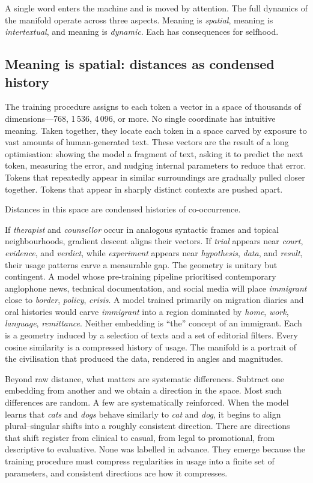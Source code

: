 A single word enters the machine and is moved by attention. The full dynamics of the manifold operate across three aspects. Meaning is \emph{spatial}, meaning is \emph{intertextual}, and meaning is \emph{dynamic}. Each has consequences for selfhood.

\subsection{Meaning is spatial: distances as condensed history}

The training procedure assigns to each token a vector in a space of thousands of dimensions---768, 1\,536, 4\,096, or more. No single coordinate has intuitive meaning. Taken together, they locate each token in a space carved by exposure to vast amounts of human-generated text. These vectors are the result of a long optimisation: showing the model a fragment of text, asking it to predict the next token, measuring the error, and nudging internal parameters to reduce that error. Tokens that repeatedly appear in similar surroundings are gradually pulled closer together. Tokens that appear in sharply distinct contexts are pushed apart.

Distances in this space are condensed histories of co-occurrence.

If \emph{therapist} and \emph{counsellor} occur in analogous syntactic frames and topical neighbourhoods, gradient descent aligns their vectors. If \emph{trial} appears near \emph{court}, \emph{evidence}, and \emph{verdict}, while \emph{experiment} appears near \emph{hypothesis}, \emph{data}, and \emph{result}, their usage patterns carve a measurable gap. The geometry is unitary but contingent. A model whose pre-training pipeline prioritised contemporary anglophone news, technical documentation, and social media will place \emph{immigrant} close to \emph{border}, \emph{policy}, \emph{crisis}. A model trained primarily on migration diaries and oral histories would carve \emph{immigrant} into a region dominated by \emph{home}, \emph{work}, \emph{language}, \emph{remittance}. Neither embedding is ``the'' concept of an immigrant. Each is a geometry induced by a selection of texts and a set of editorial filters. Every cosine similarity is a compressed history of usage. The manifold is a portrait of the civilisation that produced the data, rendered in angles and magnitudes.

Beyond raw distance, what matters are systematic differences. Subtract one embedding from another and we obtain a direction in the space. Most such differences are random. A few are systematically reinforced. When the model learns that \emph{cats} and \emph{dogs} behave similarly to \emph{cat} and \emph{dog}, it begins to align plural--singular shifts into a roughly consistent direction. There are directions that shift register from clinical to casual, from legal to promotional, from descriptive to evaluative. None was labelled in advance. They emerge because the training procedure must compress regularities in usage into a finite set of parameters, and consistent directions are how it compresses.

